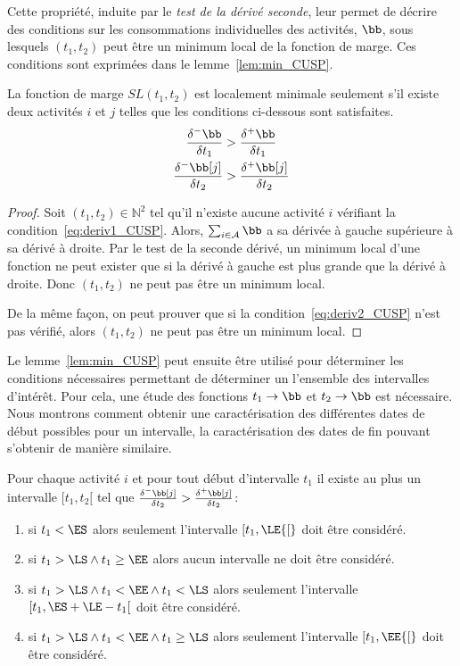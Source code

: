 Cette propriété, induite par le {\it test de la dérivé seconde}, leur
permet de décrire des conditions sur les consommations individuelles
des activités, $\bb$, sous lesquels $(t_1,t_2)$ peut être un minimum
local de la fonction de marge. Ces conditions sont exprimées dans le
lemme~\ref{lem:min_CUSP}. 

\begin{lemma}
\label{lem:min_CUSP}
La fonction de marge $SL(t_1,t_2)$ est localement minimale seulement
s'il existe deux activités $i$ et $j$ telles que les conditions
ci-dessous sont satisfaites. 
\begin{align} \frac{\delta^{-}\bb}{\delta t_1} &>
\frac{\delta^{+}\bb}{\delta t_1} \label{eq:deriv1_CUSP}\\ 
\frac{\delta^{-}\bb[j]}{\delta t_2}
& > \frac{\delta^{+}\bb[j]}{\delta t_2} \label{eq:deriv2_CUSP}
\end{align}
\end{lemma}

\begin{proof}
Soit $(t_1,t_2) \in \mathbb{N}^2$ tel qu'il n'existe aucune activité
$i$ vérifiant la condition~\eqref{eq:deriv1_CUSP}. Alors, $\sum_{i \in
  \A} \bb$ a sa dérivée à gauche supérieure à sa dérivé à droite. Par
le test de la seconde dérivé, un minimum local d'une fonction ne peut
exister que si la dérivé à gauche est plus grande que la dérivé à
droite. Donc $(t_1,t_2)$ ne peut pas être un minimum local. 

De la même façon, on peut prouver que si la
condition~\eqref{eq:deriv2_CUSP} n'est pas vérifié, alors $(t_1,t_2)$
ne peut pas être un minimum local. 
\end{proof}

Le lemme~\ref{lem:min_CUSP} peut ensuite être utilisé pour déterminer
les conditions nécessaires permettant de déterminer un l'ensemble des
intervalles d'intérêt. Pour cela, une étude des fonctions $t_1
\rightarrow \bb$ et $t_2 \rightarrow \bb$ est nécessaire. Nous montrons
comment obtenir une caractérisation des différentes dates de début
possibles pour un intervalle, la caractérisation des dates de fin
pouvant s'obtenir de manière similaire.

\begin{lemma}
  Pour chaque activité $i$ et pour tout début d'intervalle $t_1$ il
  existe au plus un intervalle $[t_1,t_2[$ tel que
  $\frac{\delta^{-}\bb[j]}{\delta t_2} >
  \frac{\delta^{+}\bb[j]}{\delta t_2} $:
  \begin{enumerate}
  \item si $t_1 < \ES$ alors seulement l'intervalle $[t_1,\LE {[}$ doit
    être considéré.
  \item si $t_1  > \LS \land t_1 \ge \EE$ alors aucun intervalle ne
    doit être considéré. 
  \item si $t_1  > \LS \land t_1 <\EE \land t_1 < \LS$ alors seulement
    l'intervalle $[t_1,\ES+\LE-t_1 [$ doit
    être considéré.
  \item si $t_1  > \LS \land t_1 <\EE \land t_1 \ge \LS$ alors
    seulement l'intervalle $[t_1,\EE {[}$ doit
    être considéré.
  \end{enumerate}
\end{lemma}


